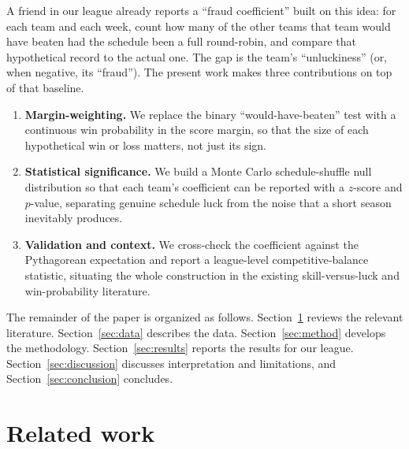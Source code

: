 \documentclass[11pt]{article}
\begin{document}
A friend in our league already reports a ``fraud coefficient'' built on this
idea: for each team and each week, count how many of the other teams that team
would have beaten had the schedule been a full round-robin, and compare that
hypothetical record to the actual one. The gap is the team's ``unluckiness''
(or, when negative, its ``fraud''). The present work makes three contributions
on top of that baseline.

\begin{enumerate}[leftmargin=*,itemsep=2pt]
\item \textbf{Margin-weighting.} We replace the binary ``would-have-beaten''
test with a continuous win probability in the score margin, so that the size
of each hypothetical win or loss matters, not just its sign.
\item \textbf{Statistical significance.} We build a Monte Carlo
schedule-shuffle null distribution so that each team's coefficient can be
reported with a $z$-score and $p$-value, separating genuine schedule luck from
the noise that a short season inevitably produces.
\item \textbf{Validation and context.} We cross-check the coefficient against
the Pythagorean expectation and report a league-level competitive-balance
statistic, situating the whole construction in the existing skill-versus-luck
and win-probability literature.
\end{enumerate}

The remainder of the paper is organized as follows. Section~\ref{sec:related}
reviews the relevant literature. Section~\ref{sec:data} describes the data.
Section~\ref{sec:method} develops the methodology. Section~\ref{sec:results}
reports the results for our league. Section~\ref{sec:discussion} discusses
interpretation and limitations, and Section~\ref{sec:conclusion} concludes.

\section{Related work}
\label{sec:related}
\end{document}
